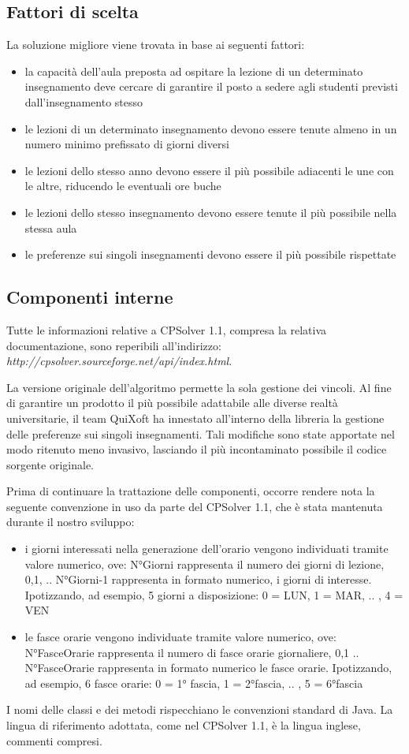 \documentclass[11pt,a4paper]{article}
\begin{document}
\subsection*{Fattori di scelta}
La soluzione migliore viene trovata in base ai seguenti fattori:
\begin{itemize}
 \item la capacità dell'aula preposta ad ospitare la lezione di un determinato insegnamento deve cercare di garantire il posto a sedere agli studenti previsti dall'insegnamento stesso
 \item le lezioni di un determinato insegnamento devono essere tenute almeno in un numero minimo prefissato di giorni diversi
 \item le lezioni dello stesso anno devono essere il più possibile adiacenti le une con le altre, riducendo le eventuali ore buche
 \item le lezioni dello stesso insegnamento devono essere tenute il più possibile nella stessa aula
 \item le preferenze sui singoli insegnamenti devono essere il più possibile rispettate
\end{itemize}
\subsection*{Componenti interne}
Tutte le informazioni relative a CPSolver 1.1, compresa la relativa documentazione, sono reperibili all'indirizzo: \textit{http://cpsolver.sourceforge.net/api/index.html}.

La versione originale dell'algoritmo permette la sola gestione dei vincoli. Al fine di garantire un prodotto il più possibile adattabile alle diverse realtà universitarie, il team QuiXoft ha innestato all'interno della libreria la gestione delle preferenze sui singoli insegnamenti. Tali modifiche sono state apportate nel modo ritenuto meno invasivo, lasciando il più incontaminato possibile il codice sorgente originale.

Prima di continuare la trattazione delle componenti, occorre rendere nota la seguente convenzione in uso da parte del CPSolver 1.1, che è stata mantenuta durante il nostro sviluppo:
\begin{itemize}
 \item i giorni interessati nella generazione dell'orario vengono individuati tramite valore numerico, ove: N°Giorni rappresenta il numero dei giorni di lezione, 0,1, .. N°Giorni-1 rappresenta in formato numerico, i giorni di interesse. Ipotizzando, ad esempio, 5 giorni a disposizione: 0 = LUN, 1 = MAR, .. , 4 = VEN
 \item le fasce orarie vengono individuate tramite valore numerico, ove: N°FasceOrarie rappresenta il numero di fasce orarie giornaliere, 0,1 .. N°FasceOrarie rappresenta in formato numerico le fasce orarie. Ipotizzando, ad esempio, 6 fasce orarie: 0 = 1° fascia, 1 = 2°fascia, .. , 5 = 6°fascia
\end{itemize}
I nomi delle classi e dei metodi rispecchiano le convenzioni standard di Java. La lingua di riferimento adottata, come nel CPSolver 1.1,  è la lingua inglese, commenti compresi.
\end{document}
